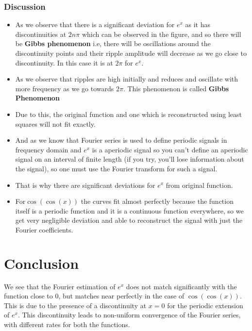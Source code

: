 \documentclass[11pt, a4paper, twoside]{article}
\begin{document}
            \subsubsection{Discussion}

            \begin{itemize}[label=-]

            \item
              As we observe that there is a significant deviation for \(e^{x}\) as
              it has discontinuities at \(2n\pi\) which can be observed in the figure,
              and so there will be \textbf{Gibbs phenomenon} i.e, there will be
              oscillations around the discontinuity points and their ripple
              amplitude will decrease as we go close to discontinuity. In this case
              it is at \(2\pi\) for \(e^{x}\).
            \item
              As we observe that ripples are high initially and reduces and
              oscillate with more frequency as we go towards \(2\pi\). This
              phenomenon is called \textbf{Gibbs Phenomenon}
            \item
              Due to this, the original function and one which is reconstructed using
              least squares will not fit exactly.
            \item
              And as we know that Fourier series is used to define periodic signals
              in frequency domain and \(e^{x}\) is a aperiodic signal so you can't
              define an aperiodic signal on an interval of finite length (if you
              try, you'll lose information about the signal), so one must use the
              Fourier transform for such a signal.
            \item
              That is why there are significant deviations for \(e^{x}\) from original
              function.
            \item
              For\(\cos(\cos(x))\) the curves fit almost perfectly because
              the function itself is a periodic function and it is a continuous
              function everywhere, so we get very negligible deviation and
              able to reconstruct the signal with just the Fourier coefficients.
            \end{itemize}
    \section{Conclusion}
    We see that the Fourier estimation of \(e^x\) does not match
significantly with the function close to \(0\), but matches near
perfectly in the case of \(\cos(\cos(x))\). This is due to the
presence of a discontinuity at \(x=0\) for the periodic extension of
\(e^x\). This discontinuity leads to non-uniform convergence of the
Fourier series, with different rates for both the functions.
\end{document}
